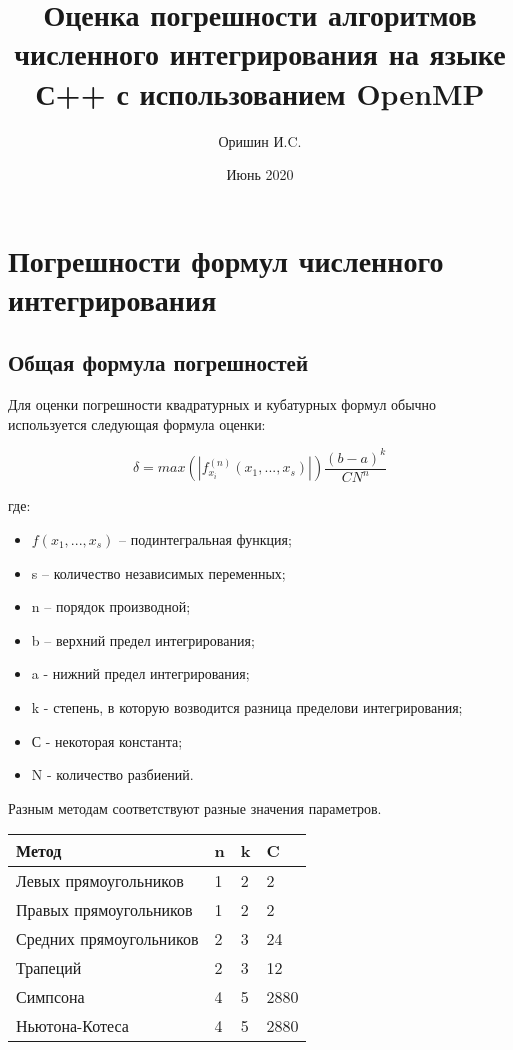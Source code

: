 \documentclass{article}
\title{Оценка погрешности алгоритмов численного интегрирования на языке С++ с использованием OpenMP}
\author{Оришин И.C.}
\date{Июнь 2020}
\begin{document}
\maketitle
\newpage
\section{Погрешности формул численного интегрирования}
\subsection{Общая формула погрешностей}
Для оценки погрешности квадратурных и кубатурных формул обычно используется 
следующая формула оценки:
\begin{center}
$$\delta = max(|f^{(n)}_{x_i}(x_1,...,x_s)|)\frac{(b-a)^k}{CN^n} $$
\end{center}

где:
\begin{itemize}
  \item $f(x_1,...,x_s)$ – подинтегральная функция;
  \item s – количество независимых переменных;
  \item n – порядок производной;
  \item b – верхний предел интегрирования;
  \item a - нижний предел интегрирования;
  \item k - степень, в которую возводится разница пределови интегрирования;
  \item С - некоторая константа;
  \item N - количество разбиений.
\end{itemize}
Разным методам соответствуют разные значения параметров.
\begin{table}[h!]
\centering
\begin{tabular}{|l|l|l|l|}
\hline
Метод  & n & k & C \\ \hline
Левых прямоугольников & 1    & 2    & 2    \\ \hline
Правых прямоугольников & 1    & 2    & 2    \\ \hline
Средних прямоугольников & 2    & 3    & 24    \\ \hline
Трапеций & 2    & 3    & 12    \\ \hline
Симпсона & 4    & 5    & 2880    \\ \hline
Ньютона-Котеса & 4    & 5    & 2880    \\ \hline
\end{tabular}
\end{table}
\end{document}
